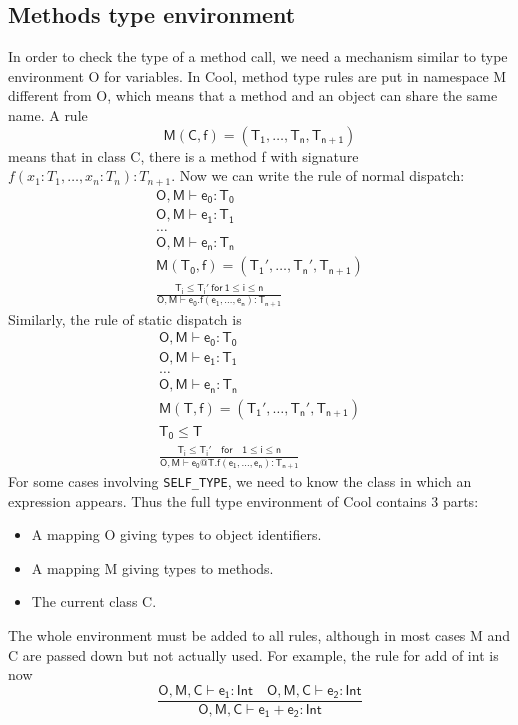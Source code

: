 \subsection{Methods type environment}
In order to check the type of a method call, we need a mechanism similar to type environment O for variables. In Cool, method type rules are put in namespace M different from O, which means that a method and an object can share the same name. A rule 
\begin{equation*}
\mathsf{M(C,f) = (T_1,\dots,T_n,T_{n+1})}
\end{equation*}
means that in class C, there is a method f with signature $f(x_1:T_1,\dots,x_n:T_n):T_{n+1}$. Now we can write the rule of normal dispatch:
\begin{gather*}
\mathsf{O,M\vdash e_0:T_0}\\
\mathsf{O,M\vdash e_1:T_1}\\
\dots\\
\mathsf{O,M\vdash e_n:T_n}\\
\mathsf{M(T_0,f) = (T_1',\dots,T_n', T_{n+1})}\\
\mathsf{\frac{T_i\leq T_i'\:for\:1\leq i \leq n}{O,M\vdash e_0.f(e_1,\dots,e_n):T_{n+1}}}
\end{gather*}
Similarly, the rule of static dispatch is 
\begin{gather*}
\mathsf{O,M\vdash e_0:T_0}\\
\mathsf{O,M\vdash e_1:T_1}\\
\dots\\
\mathsf{O,M\vdash e_n:T_n}\\
\mathsf{M(T,f) = (T_1',\dots,T_n',T_{n+1})}\\
\mathsf{T_0\leq T}\\
\mathsf{\frac{T_i\leq T_i'\quad for\quad1\leq i \leq n}{O,M\vdash e_0@T.f(e_1,\dots,e_n): T_{n+1}}}
\end{gather*}
For some cases involving \texttt{SELF\_TYPE}, we need to know the class in which an expression appears. Thus the full type environment of Cool contains 3 parts:
\begin{itemize}
\item A mapping O giving types to object identifiers.
\item A mapping M giving types to methods.
\item The current class C.
\end{itemize}
The whole environment must be added to all rules, although in most cases M and C are passed down but not actually used. For example, the rule for add of int is now
\begin{equation}\label{intaddrule}
\mathsf{\frac{O,M,C\vdash e_1:Int\quad O,M,C\vdash e_2:Int}{O,M,C\vdash e_1+e_2:Int}}
\end{equation}
